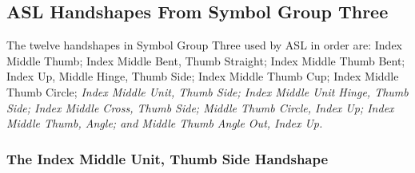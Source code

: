 \documentclass{article}
\begin{document}
\subsection{ASL Handshapes From Symbol Group Three}

The twelve handshapes in Symbol Group Three used by ASL in order are:
Index Middle Thumb;
Index Middle Bent, Thumb Straight;
Index Middle Thumb Bent;
Index Up, Middle Hinge, Thumb Side;
Index Middle Thumb Cup;
Index Middle Thumb Circle;
{\em
Index Middle Unit, Thumb Side;
Index Middle Unit Hinge, Thumb Side;
Index Middle Cross, Thumb Side;
Middle Thumb Circle, Index Up;
Index Middle Thumb, Angle;
and Middle Thumb Angle Out, Index Up.
}

\subsubsection{The Index Middle Unit, Thumb Side Handshape}
\end{document}
